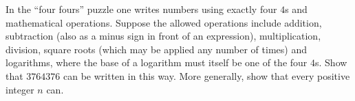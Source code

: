 In the ``four fours'' puzzle one writes numbers using exactly four $4$s and mathematical operations. Suppose the allowed operations include addition, subtraction (also as a minus sign in front of an expression), multiplication, division, square roots (which may be applied any number of times) and logarithms, where the base of a logarithm must itself be one of the four $4$s. Show that $3764376$ can be written in this way. More generally, show that every positive integer $n$ can.
